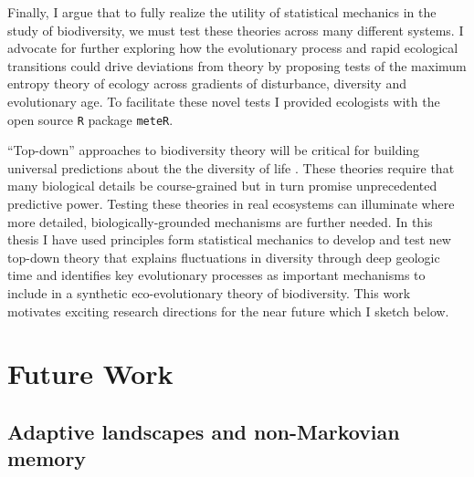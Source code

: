 Finally, I argue that to fully realize the utility of statistical
mechanics in the study of biodiversity, we must test these theories
across many different systems.  I advocate for further exploring how
the evolutionary process and rapid ecological transitions could drive
deviations from theory by proposing tests of the maximum entropy
theory of ecology \citep{harte2011} across gradients of disturbance,
diversity and evolutionary age.  To facilitate these novel tests I
provided ecologists with the open source \texttt{R} package
\texttt{meteR}.

``Top-down'' approaches to biodiversity theory will be critical for
building universal predictions about the the diversity of life
\citep{harte2011, krakauer2011}.  These theories require that many
biological details be course-grained but in turn promise unprecedented
predictive power.  Testing these theories in real ecosystems can
illuminate where more detailed, biologically-grounded mechanisms are
further needed.  In this thesis I have used principles form
statistical mechanics to develop and test new top-down theory that
explains fluctuations in diversity through deep geologic time and
identifies key evolutionary processes as important mechanisms to
include in a synthetic eco-evolutionary theory of biodiversity.  This
work motivates exciting research directions for the near future which
I sketch below.






\section{Future Work}

\subsection{Adaptive landscapes and non-Markovian memory}

